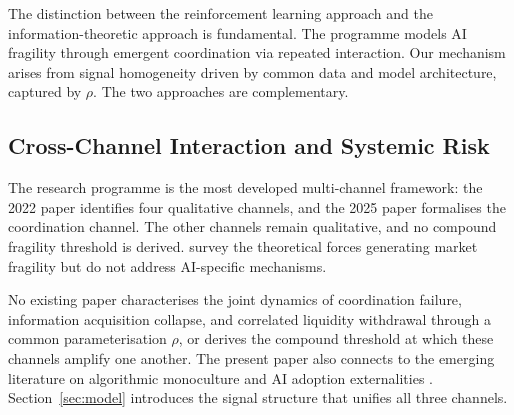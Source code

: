 The distinction between the reinforcement learning approach and the information-theoretic approach is fundamental. The \citet{dou2025a, dou2025b} programme models AI fragility through emergent coordination via repeated interaction. Our mechanism arises from signal homogeneity driven by common data and model architecture, captured by $\rho$. The two approaches are complementary.

\subsection{Cross-Channel Interaction and Systemic Risk}

The \citet{danielsson2022, danielsson2025} research programme is the most developed multi-channel framework: the 2022 paper identifies four qualitative channels, and the 2025 paper formalises the coordination channel. The other channels remain qualitative, and no compound fragility threshold is derived. \citet{goldstein2025} survey the theoretical forces generating market fragility but do not address AI-specific mechanisms.

No existing paper characterises the joint dynamics of coordination failure, information acquisition collapse, and correlated liquidity withdrawal through a common parameterisation $\rho$, or derives the compound threshold at which these channels amplify one another. The present paper also connects to the emerging literature on algorithmic monoculture \citep{kleinberg2021, peng2024} and AI adoption externalities \citep{gans2023}. Section~\ref{sec:model} introduces the signal structure that unifies all three channels.
